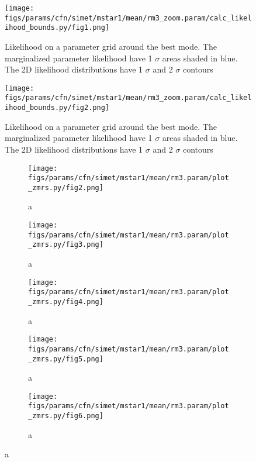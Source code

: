 \documentclass[twocolumn]{article}
\begin{document}
\begin{figure}[H]
  \center\texttt{[image: figs/params/cfn/simet/mstar1/mean/rm3\_zoom.param/calc\_likelihood\_bounds.py/fig1.png]}
  \caption{Likelihood on a parameter grid around the best mode. The marginalized parameter likelihood have
    1 $\sigma$ areas shaded in blue. The 2D likelihood distributions have 1 $\sigma$  and 2 $\sigma$ contours}
  \label{fig:basic_rd:likelihood}
\end{figure}

\begin{figure}[H]
  \center\texttt{[image: figs/params/cfn/simet/mstar1/mean/rm3\_zoom.param/calc\_likelihood\_bounds.py/fig2.png]}
  \caption{Likelihood on a parameter grid around the best mode. The marginalized parameter likelihood have
    1 $\sigma$ areas shaded in blue. The 2D likelihood distributions have 1 $\sigma$  and 2 $\sigma$ contours}
  \label{fig:basic_rd:likelihood}
\end{figure}


\begin{figure}
  \begin{subfigure}{.5\textwidth}
    \centering\texttt{[image: figs/params/cfn/simet/mstar1/mean/rm3.param/plot\_zmrs.py/fig2.png]}
    \caption{a}
  \end{subfigure}
  \begin{subfigure}{.5\textwidth}
    \centering\texttt{[image: figs/params/cfn/simet/mstar1/mean/rm3.param/plot\_zmrs.py/fig3.png]}
    \caption{a}
  \end{subfigure}
  \begin{subfigure}{.5\textwidth}
    \centering\texttt{[image: figs/params/cfn/simet/mstar1/mean/rm3.param/plot\_zmrs.py/fig4.png]}
    \caption{a}
  \end{subfigure}%
  \begin{subfigure}{.5\textwidth}
    \centering\texttt{[image: figs/params/cfn/simet/mstar1/mean/rm3.param/plot\_zmrs.py/fig5.png]}
    \caption{a}
  \end{subfigure}
  \begin{subfigure}{.5\textwidth}
    \centering\texttt{[image: figs/params/cfn/simet/mstar1/mean/rm3.param/plot\_zmrs.py/fig6.png]}
    \caption{a}
  \end{subfigure}
  
\end{figure}
\clearpage
\end{document}
